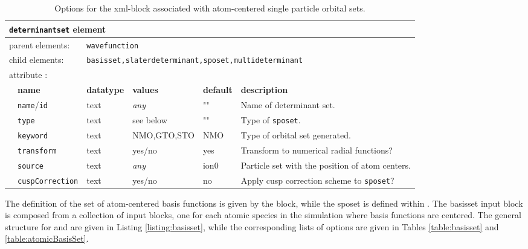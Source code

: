 \begin{table}[h]
\begin{center}
\begin{tabularx}{\textwidth}{l l l l l X }
\hline
\multicolumn{6}{l}{\texttt{determinantset} element} \\
\hline
\multicolumn{2}{l}{parent elements:} & \multicolumn{4}{l}{\texttt{wavefunction}}\\
\multicolumn{2}{l}{child  elements:} & \multicolumn{4}{l}{\texttt{basisset,slaterdeterminant,sposet,multideterminant}}\\
\multicolumn{2}{l}{attribute      :} & \multicolumn{4}{l}{}\\
   &   \bfseries name              & \bfseries datatype & \bfseries values & \bfseries default   & \bfseries description \\
   &   \texttt{name}/\texttt{id}   &  text              &  \textit{any}    &  ""             & Name of determinant set. \\
   &   \texttt{type}                    &  text               &   see below   &   ""            &  Type of \texttt{sposet}. \\
   &   \texttt{keyword}             &  text               &   NMO,GTO,STO   &  NMO        & Type of orbital set generated. \\  
   &   \texttt{transform}           &  text               &   yes/no          &  yes         &  Transform to numerical radial functions?  \\
   &   \texttt{source}               &  text               &   \textit{any}    &  ion0        & Particle set with the position of atom centers. \\
   &   \texttt{cuspCorrection}  &  text               &   yes/no          &  no         & Apply cusp correction scheme to \texttt{sposet}? \\
  \hline
\end{tabularx}
\end{center}
\caption{Options for the  xml-block associated with atom-centered single particle orbital sets.}
\label{table:determinantset}
\end{table}

The definition of the set of atom-centered basis functions is given by the  block, while the sposet is defined within . The basisset input block is composed from a collection of  input blocks, one for each atomic species in the simulation where basis functions are centered. The general structure for  and  are given in Listing \ref{listing:basisset}, while the corresponding lists of options are given in Tables \ref{table:basisset} and \ref{table:atomicBasisSet}.

